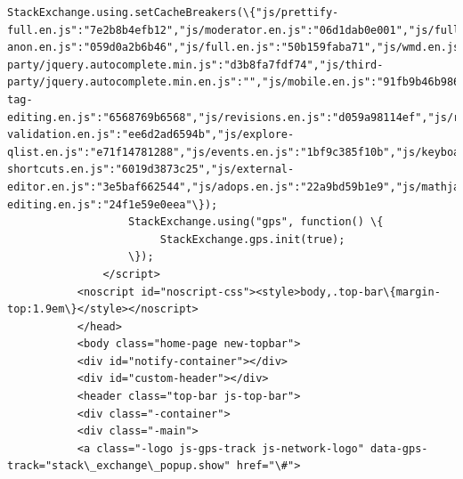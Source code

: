 \documentclass[11pt]{article}
\begin{document}
\begin{Verbatim}[commandchars=\\\{\}]
                   StackExchange.using.setCacheBreakers(\{"js/prettify-full.en.js":"7e2b8b4efb12","js/moderator.en.js":"06d1dab0e001","js/full-anon.en.js":"059d0a2b6b46","js/full.en.js":"50b159faba71","js/wmd.en.js":"2d1624a29c03","js/third-party/jquery.autocomplete.min.js":"d3b8fa7fdf74","js/third-party/jquery.autocomplete.min.en.js":"","js/mobile.en.js":"91fb9b46b986","js/help.en.js":"a9d821110060","js/tageditor.en.js":"4f83add90c55","js/tageditornew.en.js":"f96d3bb8fe70","js/inline-tag-editing.en.js":"6568769b6568","js/revisions.en.js":"d059a98114ef","js/review.en.js":"bf50f86e4b67","js/tagsuggestions.en.js":"d1ff9b84abe5","js/post-validation.en.js":"ee6d2ad6594b","js/explore-qlist.en.js":"e71f14781288","js/events.en.js":"1bf9c385f10b","js/keyboard-shortcuts.en.js":"6019d3873c25","js/external-editor.en.js":"3e5baf662544","js/adops.en.js":"22a9bd59b1e9","js/mathjax-editing.en.js":"24f1e59e0eea"\});
                   StackExchange.using("gps", function() \{
                        StackExchange.gps.init(true);
                   \});
               </script>
           <noscript id="noscript-css"><style>body,.top-bar\{margin-top:1.9em\}</style></noscript>
           </head>
           <body class="home-page new-topbar">
           <div id="notify-container"></div>
           <div id="custom-header"></div>
           <header class="top-bar js-top-bar">
           <div class="-container">
           <div class="-main">
           <a class="-logo js-gps-track js-network-logo" data-gps-track="stack\_exchange\_popup.show" href="\#">

\end{Verbatim}
\end{document}
